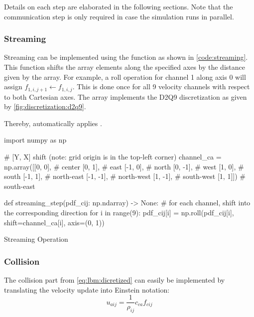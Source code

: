 Details on each step are elaborated in the following sections. Note that the communication step is only required in case the simulation runs in parallel.

\subsubsection{Streaming}

Streaming can be implemented using the  function as shown in \cref{code:streaming}. This function shifts the array elements along the specified axes by the distance given by the  array. For example, a roll operation for channel 1 along axis 0 will assign $f_{1,i,j+1} \gets f_{1,i,j}$. This is done once for all 9 velocity channels with respect to both Cartesian axes. The  array implements the D2Q9 discretization as given by \cref{fig:discretization:d2q9}.

Thereby,  automatically applies .

\begin{listing}[ht!]
    \begin{pycode}
        import numpy as np
    
        # [Y, X] shift (note: grid origin is in the top-left corner)
        channel_ca = np.array([[0, 0],    # center
                               [0, 1],    # east
                               [-1, 0],   # north
                               [0, -1],   # west
                               [1, 0],    # south
                               [-1, 1],   # north-east
                               [-1, -1],  # north-west
                               [1, -1],   # south-west
                               [1, 1]])   # south-east
    
        def streaming_step(pdf_cij: np.ndarray) -> None:
            # for each channel, shift into the corresponding direction
            for i in range(9):
                pdf_cij[i] = np.roll(pdf_cij[i], shift=channel_ca[i], axis=(0, 1))
    \end{pycode}
    \caption{Streaming Operation}
    \label{code:streaming}
\end{listing}

\subsubsection{Collision}

The collision part from \cref{eq:lbm:dicretized} can easily be implemented by translating the velocity update into Einstein notation:
\begin{equation}
    u_{aij} = \frac{1}{\rho_{ij}} c_{ca} f_{cij}
    \label{eq:collision-einstein}
\end{equation}

